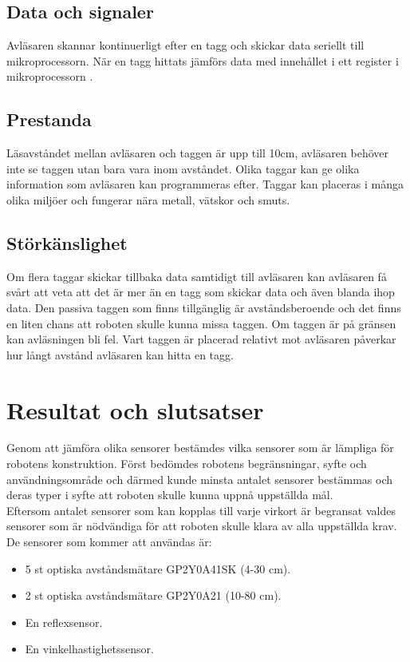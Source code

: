 \documentclass[11pt]{article}
\begin{document}
\begin{flushleft}
\subsection{Data och signaler}
Avläsaren skannar kontinuerligt efter en tagg och skickar data seriellt till mikroprocessorn. När en tagg hittats jämförs data med innehållet i ett register i mikroprocessorn \autocite{vanheden_rfid}. 
 
\subsection{Prestanda}
Läsavståndet mellan avläsaren och taggen är upp till 10cm, avläsaren behöver inte se taggen utan bara vara inom avståndet. Olika taggar kan ge olika information som avläsaren kan programmeras efter. Taggar kan placeras i många olika miljöer och fungerar nära metall, vätskor och smuts.  
 
\subsection{Störkänslighet}
Om flera taggar skickar tillbaka data samtidigt till avläsaren kan avläsaren få svårt att veta att det är mer än en tagg som skickar data och även blanda ihop data. Den passiva taggen som finns tillgänglig är avståndsberoende och det finns en liten chans att roboten skulle kunna missa taggen. Om taggen är på gränsen kan avläsningen bli fel. Vart taggen är placerad relativt mot avläsaren påverkar hur långt avstånd avläsaren kan hitta en tagg.


\section{Resultat och slutsatser}
Genom att jämföra olika sensorer bestämdes vilka sensorer som är lämpliga för robotens konstruktion. Först bedömdes robotens begränsningar, syfte och användningsområde och därmed kunde minsta antalet sensorer bestämmas och deras typer i syfte att roboten skulle kunna uppnå uppställda mål. 
\\[0.1in]

Eftersom antalet sensorer som kan kopplas till varje virkort är begransat valdes sensorer som är nödvändiga för att roboten skulle klara av alla uppställda krav. De sensorer som kommer att användas är:

\begin{itemize}
\item 5 st optiska avståndsmätare GP2Y0A41SK (4-30 cm).
\item 2 st optiska avståndsmätare GP2Y0A21 (10-80 cm).
\item En reflexsensor.
\item En vinkelhastighetssensor.
\end{itemize}


\end{flushleft}
\end{document}
